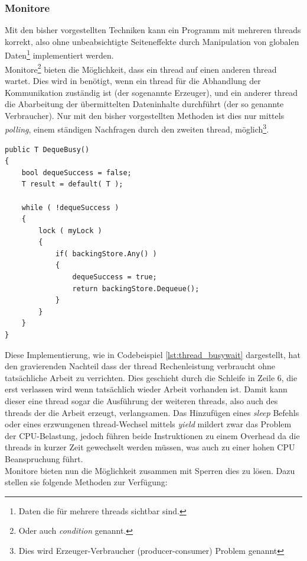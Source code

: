 \subsubsection{Monitore}	
Mit den bisher vorgestellten Techniken kann ein Programm mit mehreren threads korrekt, also ohne unbeabsichtigte Seiteneffekte durch Manipulation von globalen Daten\footnote{Daten die für mehrere threads sichtbar sind.}  implementiert werden. 
\\Monitore\footnote{Oder auch \textit{condition} genannt\parencite[S. 199]{Dahlin2012}.} bieten die Möglichkeit, dass ein thread auf einen anderen thread wartet. Dies wird in benötigt, wenn ein thread für die Abhandlung der Kommunikation zuständig ist (der sogenannte Erzeuger), und ein anderer thread die Abarbeitung der übermittelten Dateninhalte durchführt (der so genannte Verbraucher). Nur mit den bisher vorgestellten Methoden ist dies nur mittels \textit{polling}, einem ständigen Nachfragen durch den zweiten thread, möglich\footnote{Dies wird Erzeuger-Verbraucher (producer-consumer) Problem genannt\parencite[S. 188]{tanenbaum2016}}\parencite[S. 199ff]{Dahlin2012}. 
\begin{lstlisting}[caption={Thread naiver Monitor},label={lst:thread_busywait},captionpos=b]
public T DequeBusy()
{
	bool dequeSuccess = false;
	T result = default( T );

	while ( !dequeSuccess )
	{
		lock ( myLock )
		{
			if( backingStore.Any() )
			{
				dequeSuccess = true;
				return backingStore.Dequeue();
			}
		}
	}
}

\end{lstlisting}
Diese Implementierung, wie in Codebeispiel \ref{lst:thread_busywait} dargestellt, hat den gravierenden Nachteil dass der thread Rechenleistung verbraucht ohne tatsächliche Arbeit zu verrichten. Dies geschieht durch die Schleife in Zeile 6, die erst verlassen wird wenn tatsächlich wieder Arbeit vorhanden ist. Damit kann dieser eine thread sogar die Ausführung der weiteren threads, also auch des threads der die Arbeit erzeugt, verlangsamen. Das Hinzufügen eines \textit{sleep} Befehls oder eines erzwungenen thread-Wechsel mittels \textit{yield} mildert zwar das Problem der CPU-Belastung, jedoch führen beide Instruktionen zu einem Overhead da die threads in kurzer Zeit gewechselt werden müssen, was auch zu einer hohen CPU Beanspruchung führt.
\\Monitore bieten nun die Möglichkeit zusammen mit Sperren dies zu lösen. Dazu stellen sie folgende Methoden zur Verfügung:\parencite[S. 201]{Dahlin2012}\parencite{ms_monitor}
